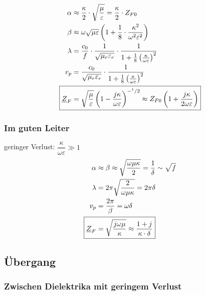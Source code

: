 \begin{align*}
    \alpha                  & \approx\dfrac{\kappa}{2}\cdot\sqrt{\dfrac{\mu}{\varepsilon}} = \frac{\kappa}{2}\cdot Z_{F0}                                                                \\
    \beta                   & \approx\omega\sqrt{\mu\varepsilon}\left(1+\dfrac{1}{8}\cdot\dfrac{\kappa^2}{\omega^2\varepsilon^2}\right)                                                  \\
    \lambda                 & = \dfrac{c_0}{f}\cdot\dfrac{1}{\sqrt{\mu_r\varepsilon_r}}\cdot\frac{1}{1+\frac{1}{8}\left(\frac{\kappa}{\omega\varepsilon}\right)^2}                       \\
    v_p                     & = \dfrac{c_0}{\sqrt{\mu_r\varepsilon_r}}\cdot\frac{1}{1+\frac{1}{8}\left(\frac{\kappa}{\omega\varepsilon}\right)^2}                                        \\
    \Aboxed{\underline{Z}_F & = \sqrt{\dfrac{\mu}{\varepsilon}}\left(1-\frac{j\kappa}{\omega\varepsilon}\right)^{-^1/2} \approx Z_{F0}\left(1+\frac{j\kappa}{2\omega\varepsilon}\right)}
\end{align*}

\subsubsection{Im guten Leiter}
geringer Verlust: $\dfrac{\kappa}{\omega\varepsilon} \gg 1$
\begin{align*}
    \alpha                  & \approx \beta \approx\sqrt{\frac{\omega\mu\kappa}{2}}=\dfrac{1}{\delta}\sim\sqrt{f} \\
    \lambda                 & = 2\pi \sqrt{\dfrac{2}{\omega\mu\kappa}}=2\pi\delta                                 \\
    v_p                     & = \frac{2\pi}{\beta} = \omega\delta                                                 \\
    \Aboxed{\underline{Z}_F & = \sqrt{\dfrac{j\omega\mu}{\kappa}} \approx \dfrac{1+j}{\kappa\cdot\delta}}
\end{align*}
\newpage
\subsection{Übergang}
\subsubsection{Zwischen Dielektrika mit geringem Verlust}

